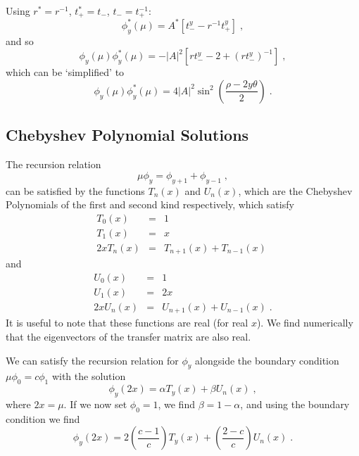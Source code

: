 \documentclass[a4paper,10pt]{article}
\begin{document}
Using $r^* = r^{-1}$, $t_+^* = t_-$, $t_- = t_+^{-1}$:
\begin{equation}
  \phi^*_y(\mu) = A^* \left[ t_-^y - r^{-1}t_+^y \right] \;,
\end{equation}
and so
\begin{equation}
  \phi_y(\mu) \phi^*_y(\mu) = - |A|^2 \left[ r t_-^y -2  + (rt_-^y)^{-1} \right] \;,
\end{equation}
which can be `simplified' to
\begin{equation}
  \phi_y(\mu) \phi^*_y(\mu) = 4|A|^2 \sin^2 \left( \frac{\rho - 2y\theta}{2} \right) \;.
\end{equation}

\subsection{Chebyshev Polynomial Solutions}

The recursion relation 
\begin{equation}
  \mu \phi_y  = \phi_{y+1} + \phi_{y-1} \;,
\end{equation}
can be satisfied by the functions $T_n(x)$ and  $U_n(x)$, which are the Chebyshev Polynomials of the first and second kind respectively, which satisfy
\begin{eqnarray}
  T_0(x) & = & 1 \nonumber \\
  T_1(x) & = & x \nonumber \\
  2xT_n(x) & = & T_{n+1}(x) + T_{n-1}(x) \;
\end{eqnarray}
and
\begin{eqnarray}
  U_0(x) & = & 1 \nonumber \\
  U_1(x) & = & 2x \nonumber \\
  2xU_n(x) & = & U_{n+1}(x) + U_{n-1}(x) \;.
\end{eqnarray}
It is useful to note that these functions are real (for real $x$). We find numerically that the eigenvectors of the transfer matrix are also real. 

We can satisfy the recursion relation for $\phi_y$ alongside the boundary condition $\mu\phi_0 = c\phi_1$ with the solution
\begin{equation}
  \phi_y(2x) = \alpha T_y(x) + \beta U_n(x) \;,
\end{equation}
where $2x = \mu$. If we now set $\phi_0 = 1$, we find $\beta = 1 - \alpha$, and using the boundary condition we find
\begin{equation}
  \phi_y(2x) = 2\left( \frac{c-1}{c}\right) T_y(x) +  \left(\frac{2-c}{c} \right) U_n(x) \;.
\end{equation}
\end{document}
